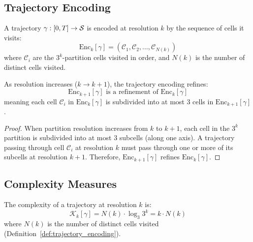 \subsection{Trajectory Encoding}

\begin{definition}
\label{def:trajectory_encoding}
A trajectory $\gamma: [0,T] \to \mathcal{S}$ is encoded at resolution $k$ by the sequence of cells it visits:
\begin{equation}
\text{Enc}_k[\gamma] = \left(\mathcal{C}_1, \mathcal{C}_2, \ldots, \mathcal{C}_{N(k)}\right)
\label{eq:trajectory_encoding}
\end{equation}
where $\mathcal{C}_i$ are the $3^k$-partition cells visited in order, and $N(k)$ is the number of distinct cells visited.
\end{definition}

\begin{theorem}
\label{thm:encoding_refinement}
As resolution increases ($k \to k+1$), the trajectory encoding refines:
\begin{equation}
\text{Enc}_{k+1}[\gamma] \text{ is a refinement of } \text{Enc}_k[\gamma]
\label{eq:encoding_refinement}
\end{equation}
meaning each cell $\mathcal{C}_i$ in $\text{Enc}_k[\gamma]$ is subdivided into at most 3 cells in $\text{Enc}_{k+1}[\gamma]$.
\end{theorem}

\begin{proof}
When partition resolution increases from $k$ to $k+1$, each cell in the $3^k$ partition is subdivided into at most 3 subcells (along one axis). A trajectory passing through cell $\mathcal{C}_i$ at resolution $k$ must pass through one or more of its subcells at resolution $k+1$. Therefore, $\text{Enc}_{k+1}[\gamma]$ refines $\text{Enc}_k[\gamma]$.
\end{proof}

\subsection{Complexity Measures}

\begin{definition}
\label{def:trajectory_complexity}
The complexity of a trajectory at resolution $k$ is:
\begin{equation}
\mathcal{K}_k[\gamma] = N(k) \cdot \log_3 3^k = k \cdot N(k)
\label{eq:trajectory_complexity}
\end{equation}
where $N(k)$ is the number of distinct cells visited (Definition~\ref{def:trajectory_encoding}).
\end{definition}

